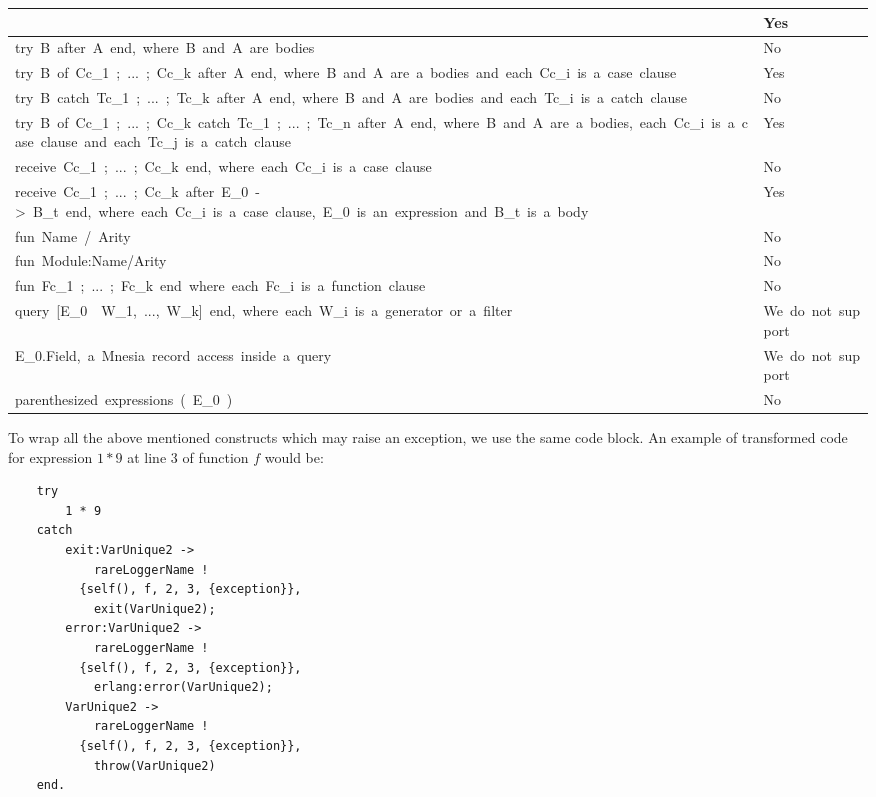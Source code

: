 \documentclass[12pt,a4paper]{report}
\begin{document}
\begin{supertabular}{| p{13cm} | p{2cm} |}
&
 Yes
\\\hline
try\ B\ after\ A\ end,\ where\ B\ and\ A\ are\ bodies
&
No
\\\hline
try\ B\ of\ Cc\_1\ ;\ ...\ ;\ Cc\_k\ after\ A\ end,\ where\ B\ and\ A\ are\ a\ bodies\ and\ each\ Cc\_i\ is\ a\ case\ clause
&
Yes
\\\hline
try\ B\ catch\ Tc\_1\ ;\ ...\ ;\ Tc\_k\ after\ A\ end,\ where\ B\ and\ A\ are\ bodies\ and\ each\ Tc\_i\ is\ a\ catch\ clause\ 
&
No
\\\hline
try\ B\ of\ Cc\_1\ ;\ ...\ ;\ Cc\_k\ catch\ Tc\_1\ ;\ ...\ ;\ Tc\_n\ after\ A\ end,\ where\ B\ and\ A\ are\ a\ bodies,\ each\ Cc\_i\ is\ a\ case\ clause\ and\ each\ Tc\_j\ is\ a\ catch\ clause
&
Yes
\\\hline
receive\ Cc\_1\ ;\ ...\ ;\ Cc\_k\ end,\ where\ each\ Cc\_i\ is\ a\ case\ clause
&
No
\\\hline
receive\ Cc\_1\ ;\ ...\ ;\ Cc\_k\ after\ E\_0\ {}-{\textgreater}\ B\_t\ end,\ where\ each\ Cc\_i\ is\ a\ case\ clause,\ E\_0\ is\ an\ expression\ and\ B\_t\ is\ a\ body
&
Yes
\\\hline
fun\ Name\ /\ Arity
&
No
\\\hline
fun\ Module:Name/Arity
&
No
\\\hline
fun\ Fc\_1\ ;\ ...\ ;\ Fc\_k\ end\ where\ each\ Fc\_i\ is\ a\ function\ clause
&
No
\\\hline
query\ [E\_0\ {\textbar}{\textbar}\ W\_1,\ ...,\ W\_k]\ end,\ where\ each\ W\_i\ is\ a\ generator\ or\ a\ filter
&
We\ do\ not\ support
\\\hline
E\_0.Field,\ a\ Mnesia\ record\ access\ inside\ a\ query 
&
We\ do\ not\ support\ 
\\\hline
parenthesized\ expressions\ (\ E\_0\ )
&
No
\\\hline
\end{supertabular}
 
To wrap all the above mentioned constructs which may raise an exception, we use the same code block. An example of transformed code for expression $1 * 9$  at line $3$ of function $f$ would be:
 
\begin{lstlisting}
    try 
        1 * 9 
    catch
        exit:VarUnique2 ->
            rareLoggerName ! 
	      {self(), f, 2, 3, {exception}},
            exit(VarUnique2);
        error:VarUnique2 ->
            rareLoggerName ! 
	      {self(), f, 2, 3, {exception}},
            erlang:error(VarUnique2);
        VarUnique2 ->
            rareLoggerName !
	      {self(), f, 2, 3, {exception}},
            throw(VarUnique2)
    end.
\end{lstlisting}
\end{document}
